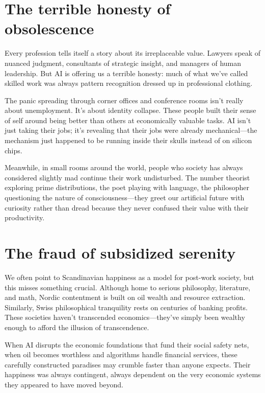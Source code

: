 \documentclass[11pt]{article}
\begin{document}
\section{The terrible honesty of obsolescence}

Every profession tells itself a story about its irreplaceable value. Lawyers
speak of nuanced judgment, consultants of strategic insight, and managers of
human leadership. But AI is offering us a terrible honesty: much of what we've
called skilled work was always pattern recognition dressed up in professional
clothing.

The panic spreading through corner offices and conference rooms isn't really
about unemployment. It's about identity collapse. These people built their
sense of self around being better than others at economically valuable tasks.
AI isn't just taking their jobs; it's revealing that their jobs were already
mechanical---the mechanism just happened to be running inside their skulls
instead of on silicon chips.

Meanwhile, in small rooms around the world, people who society has always
considered slightly mad continue their work undisturbed. The number theorist
exploring prime distributions, the poet playing with language, the philosopher
questioning the nature of consciousness---they greet our artificial future with
curiosity rather than dread because they never confused their value with their
productivity.

\section{The fraud of subsidized serenity}

We often point to Scandinavian happiness as a model for post-work society, but
this misses something crucial. Although home to serious philosophy, literature,
and math, Nordic contentment is built on oil wealth and resource extraction.
Similarly, Swiss philosophical tranquility rests on centuries of banking
profits. These societies haven't transcended economics---they've simply been
wealthy enough to afford the illusion of transcendence.

When AI disrupts the economic foundations that fund their social safety nets,
when oil becomes worthless and algorithms handle financial services, these
carefully constructed paradises may crumble faster than anyone expects. Their
happiness was always contingent, always dependent on the very economic systems
they appeared to have moved beyond.
\end{document}
